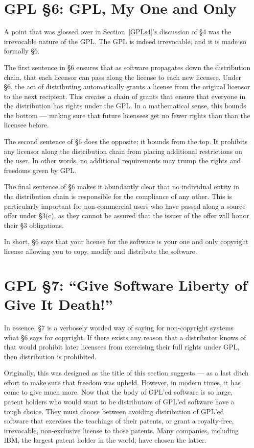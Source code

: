 \documentclass[12pt]{report}
\begin{document}
\section{GPL \S 6: GPL, My One and Only}
\label{GPLs6}

A point that was glossed over in Section~\ref{GPLs4}'s discussion of \S 4
was the irrevocable nature of the GPL\@.  The GPL is indeed irrevocable,
and it is made so formally \S 6.

The first sentence in \S 6 ensures that as software propagates down the
distribution chain, that each licensor can pass along the license to each
new licensee.  Under \S 6, the act of distributing automatically grants a
license from the original licensor to the next recipient.  This creates a
chain of grants that ensure that everyone in the distribution has rights
under the GPL\@.  In a mathematical sense, this bounds the bottom ---
making sure that future licensees get no fewer rights than than the
licensee before.

The second sentence of \S 6 does the opposite; it bounds from the top.  It
prohibits any licensor along the distribution chain from placing
additional restrictions on the user.  In other words, no additional
requirements may trump the rights and freedoms given by GPL\@.

The final sentence of \S 6 makes it abundantly clear that no individual
entity in the distribution chain is responsible for the compliance of any
other.  This is particularly important for non-commercial users who have
passed along a source offer under \S 3(c), as they cannot be assured that
the issuer of the offer will honor their \S 3 obligations.

In short, \S 6 says that your license for the software is your one and
only copyright license allowing you to copy, modify and distribute the
software.

\section{GPL \S 7: ``Give Software Liberty of Give It Death!''}
\label{GPLs7}

In essence, \S 7 is a verbosely worded way of saying for non-copyright
systems what \S 6 says for copyright.  If there exists any reason that a
distributor knows of that would prohibit later licensees from exercising
their full rights under GPL, then distribution is prohibited.

Originally, this was designed as the title of this section suggests --- as
a last ditch effort to make sure that freedom was upheld.  However, in
modern times, it has come to give much more.  Now that the body of GPL'ed
software is so large, patent holders who would want to be distributors of
GPL'ed software have a tough choice.  They must choose between avoiding
distribution of GPL'ed software that exercises the teachings of their
patents, or grant a royalty-free, irrevocable, non-exclusive license to
those patents.  Many companies, including IBM, the largest patent holder
in the world, have chosen the latter.
\end{document}
